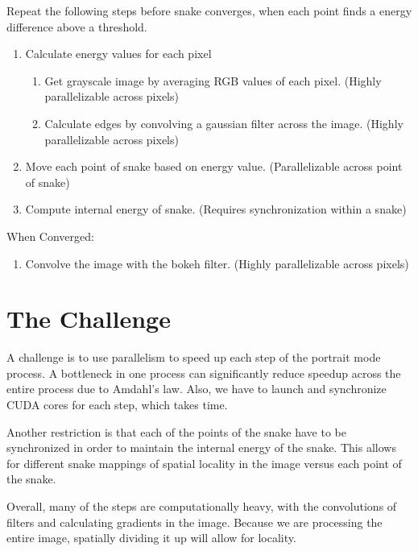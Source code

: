 \documentclass[12pt]{article}
\begin{document}
Repeat the following steps before snake converges, when each point finds a
energy difference above a threshold.
\begin{enumerate}
    \item
        Calculate energy values for each pixel
            \begin{enumerate}
                \item
                    Get grayscale image by averaging RGB values of each pixel.
                    (Highly parallelizable across pixels)
                \item
                    Calculate edges by convolving a gaussian filter across the
                    image. (Highly parallelizable across pixels)
            \end{enumerate}
    \item
        Move each point of snake based on energy value. (Parallelizable across
        point of snake)
    \item
        Compute internal energy of snake. (Requires synchronization within a
        snake)
\end{enumerate}

When Converged:
\begin{enumerate}
    \item
        Convolve the image with the bokeh filter. (Highly parallelizable across
        pixels)
\end{enumerate}

\section{The Challenge}

A challenge is to use parallelism to speed up each step of the portrait mode
process. A bottleneck in one process can significantly reduce speedup across
the entire process due to Amdahl's law. Also, we have to launch
and synchronize CUDA cores for each step, which takes time.

Another restriction is that each of the points of the snake have to be
synchronized in order to maintain the internal energy of the snake. This allows
for different snake mappings of spatial locality in the image versus each point
of the snake.

Overall, many of the steps are computationally heavy, with the convolutions
of filters and calculating gradients in the image. Because we are processing
the entire image, spatially dividing it up will allow for locality.
\end{document}
